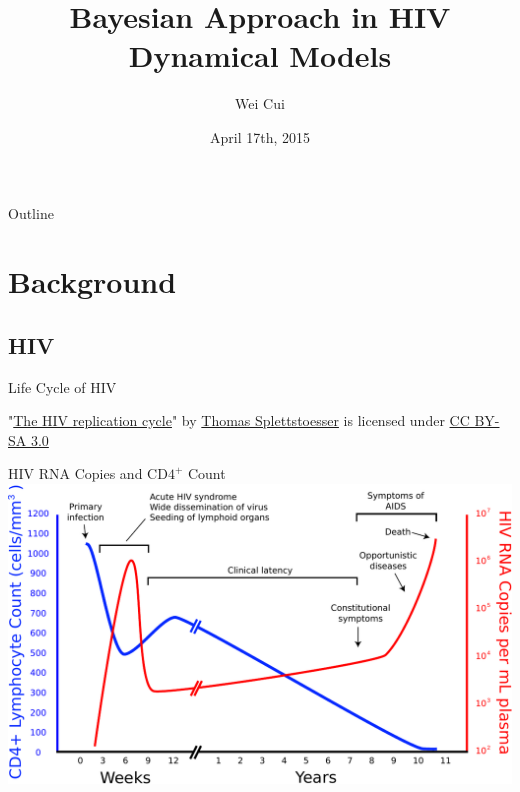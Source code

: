 \documentclass[9pt]{beamer}
\title[Bayesian Approach in HIV Dynamical Models]{Bayesian Approach in HIV Dynamical Models}
\author[Wei Cui]{Wei Cui  { \texttt{}}}
\institute{~\\Department of Statistics \\University of California, Riverside}
\date{\small{April 17th, 2015}}
\begin{document}



\begin{frame} %
  \titlepage
\end{frame} %



\begin{frame}{Outline} %
  \tableofcontents
\end{frame} %

\section[Background]{Background}
\subsection[HIV]{HIV}
\begin{frame}{Life Cycle of HIV}
  \begin{figure}
    \centering
    \def\svgwidth{\columnwidth}
    
  \end{figure}
"\href{http://en.wikipedia.org/wiki/HIV\#/media/File:HIV-replication-cycle.svg}{The HIV replication cycle}" by \href{http://commons.wikimedia.org/wiki/User:Splette}{Thomas Splettstoesser} is licensed under \href{http://creativecommons.org/licenses/by-sa/3.0/}{CC BY-SA 3.0}
\end{frame}

\begin{frame}{HIV RNA Copies and CD$4^{+}$ Count}
  \includegraphics[scale=0.5]{Hiv-timecourse_copy}
\end{frame}
\end{document}
